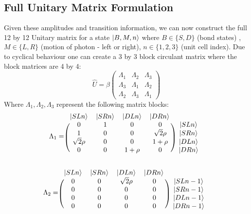 \subsection{Full Unitary Matrix Formulation}
Given these amplitudes and transition information, we can now construct the full 12 by 12 Unitary matrix for a state $\ket{B,M,n}$ where $B \in \{S, D\}$ (bond states) , $M \in \{L, R\}$ (motion of photon - left or right), $n \in \{1,2,3\}$ (unit cell index). Due to cyclical behaviour one can create a 3 by 3 block circulant matrix where the block matrices are 4 by 4:
\begin{equation}
    \hat{U} = \beta \begin{pmatrix}
    \Lambda_{1} & \Lambda_{2} & \Lambda_{3} \\
    \Lambda_{3} & \Lambda_{1} & \Lambda_{2} \\
    \Lambda_{2} & \Lambda_{3} & \Lambda_{1} \end{pmatrix}
    \end{equation}
Where $\Lambda_{1}, \Lambda_{2}, \Lambda_{3}$ represent the following matrix blocks:
\begin{equation}
    \Lambda_{1} = 
    \begin{blockarray}{ccccc}
    \ket{SLn} & \ket{SRn} & \ket{DLn} & \ket{DRn}\\
    \begin{block}{(cccc)c}
     0 & 1 & 0 & 0 & \ket{SLn}\\
    1 & 0 & 0 & \sqrt{2}\rho & \ket{SRn}\\
    \sqrt{2}\rho & 0 & 0 & 1+\rho & \ket{DLn} \\
    0 & 0 & 1+\rho & 0 & \ket{DRn} \\
    \end{block}
    \end{blockarray}
\end{equation}

\begin{equation}
    \Lambda_{2} = 
    \begin{blockarray}{ccccc}
    \ket{SLn} & \ket{SRn} & \ket{DLn} & \ket{DRn}\\
    \begin{block}{(cccc)c}
    0 & 0 & \sqrt{2}\rho & 0 & \ket{SLn-1} \\
    0 & 0 & 0 & 0 & \ket{SRn-1} \\
    0 & 0 & 0 & 0 & \ket{DLn-1} \\
    0 & 0 & 0 & 0 & \ket{DRn-1} \\
    \end{block}
    \end{blockarray}
\end{equation}

